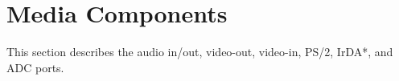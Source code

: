 \documentclass[11pt, twoside, pdftex]{article}
\newcommand{\commonFiles}{../../../common/doc}
\begin{document}



\newpage
\section{Media Components}
\label{sec:multi}

This section describes the audio in/out, video-out, video-in, PS/2, IrDA*, and ADC ports.








\end{document}
